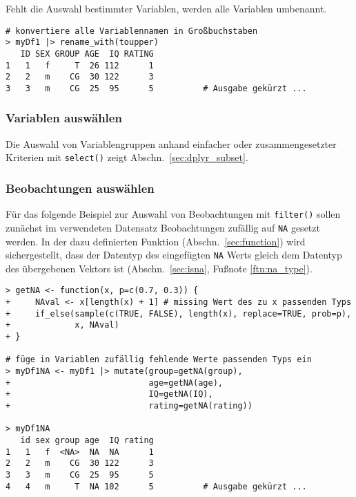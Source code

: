 Fehlt die Auswahl bestimmter Variablen, werden alle Variablen umbenannt.
\begin{lstlisting}
# konvertiere alle Variablennamen in Großbuchstaben
> myDf1 |> rename_with(toupper)
   ID SEX GROUP AGE  IQ RATING
1   1   f     T  26 112      1
2   2   m    CG  30 122      3
3   3   m    CG  25  95      5          # Ausgabe gekürzt ...
\end{lstlisting}

\subsubsection{Variablen auswählen}

Die Auswahl von Variablengruppen anhand einfacher oder zusammengesetzter Kriterien mit \lstinline!select()! zeigt Abschn.\ \ref{sec:dplyr_subset}.

\subsubsection{Beobachtungen auswählen}

Für das folgende Beispiel zur Auswahl von Beobachtungen mit \lstinline!filter()! sollen zunächst im verwendeten Datensatz Beobachtungen zufällig auf \lstinline!NA! gesetzt werden. In der dazu definierten Funktion (Abschn.\ \ref{sec:function}) wird sichergestellt, dass der Datentyp des eingefügten \lstinline!NA! Werts gleich dem Datentyp des übergebenen Vektors ist (Abschn.\ \ref{sec:isna}, Fußnote \ref{ftn:na_type}).
\begin{lstlisting}
> getNA <- function(x, p=c(0.7, 0.3)) {
+     NAval <- x[length(x) + 1] # missing Wert des zu x passenden Typs
+     if_else(sample(c(TRUE, FALSE), length(x), replace=TRUE, prob=p),
+             x, NAval)
+ }

# füge in Variablen zufällig fehlende Werte passenden Typs ein
> myDf1NA <- myDf1 |> mutate(group=getNA(group),
+                            age=getNA(age),
+                            IQ=getNA(IQ),
+                            rating=getNA(rating))

> myDf1NA
   id sex group age  IQ rating
1   1   f  <NA>  NA  NA      1
2   2   m    CG  30 122      3
3   3   m    CG  25  95      5
4   4   m     T  NA 102      5          # Ausgabe gekürzt ...
\end{lstlisting}

